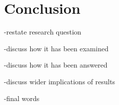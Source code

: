 
\chapter{Conclusion}
\label{chap:conclusion}

-restate research question

-discuss how it has been examined

-discuss how it has been answered

-discuss wider implications of results

-final words


